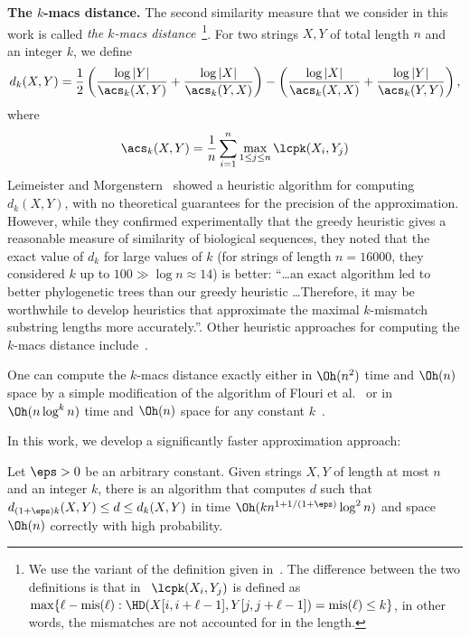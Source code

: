 
\textbf{The $k$-macs distance.} The second similarity measure that we consider in this work is called \emph{the $k$-macs distance}~\cite{kmacs,Thankachan2017}\footnote{We use the variant of the definition given in~\cite{Thankachan2017}. The difference between the two definitions is that in~\cite{kmacs} $\lcpk (X_i, Y_j)$ is defined as $\max\{\ell-\mathrm{mis}(\ell) : \HD(X[i,i+\ell-1], Y[j, j+\ell-1]) = \mathrm{mis}(\ell) \le k\}$, in other words, the mismatches are not accounted for in the length.}. For two strings $X,  Y$ of total length $n$ and an integer $k$, we define
%
$$d_k(X, Y) = \frac{1}{2} \left( \frac{\log |Y|}{\acs_k(X, Y)} + \frac{\log |X|}{\acs_k(Y,X)}\right) - \left(\frac{\log |X|}{\acs_k(X, X)} + \frac{\log |Y|}{\acs_k(Y, Y)}\right),$$ 
where
$$\acs_k(X, Y) = \frac{1}{n} \sum_{i=1}^{n} \max_{1 \le j \le n} \lcpk(X_i, Y_j)$$
%
Leimeister and Morgenstern~\cite{kmacs} showed a heuristic algorithm for computing $d_k(X, Y)$, with no theoretical guarantees for the precision of the approximation. However, while they confirmed experimentally that the greedy heuristic gives a reasonable measure of similarity of biological sequences, they noted that the exact value of $d_k$ for large values of $k$ (for strings of length $n=16000$, they considered $k$ up to $100 \gg \log n \approx 14$) is better: ``\ldots an exact algorithm led to better phylogenetic trees than our greedy heuristic \ldots Therefore, it may be worthwhile to develop heuristics that approximate the maximal $k$-mismatch substring lengths more accurately.''. 
Other heuristic approaches for computing the $k$-macs distance include~\cite{Thankachan2017,DBLP:journals/jcb/ThankachanCLAA16}.

One can compute the $k$-macs distance exactly either in $\Oh(n^2)$ time and $\Oh(n)$ space by a simple modification of the algorithm of Flouri et al.~\cite{DBLP:journals/ipl/FlouriGKU15} or in $\Oh(n \log^k n)$ time and $\Oh(n)$ space for any constant $k$~\cite{DBLP:journals/jcb/ThankachanAA16}. 

In this work, we develop a significantly faster approximation approach:

\begin{theorem}
\label{th:kmacs}
Let $\eps > 0$ be an arbitrary constant. Given strings $X, Y$ of length at most $n$ and an integer $k$, there is an algorithm that computes $d$ such that $d_{(1+\eps)k} (X, Y) \le d \le d_{k} (X, Y)$ in time $\Oh(k n^{1+1/(1+\eps)} \log^2 n)$ and space $\Oh(n)$ correctly with high probability.
\end{theorem}




